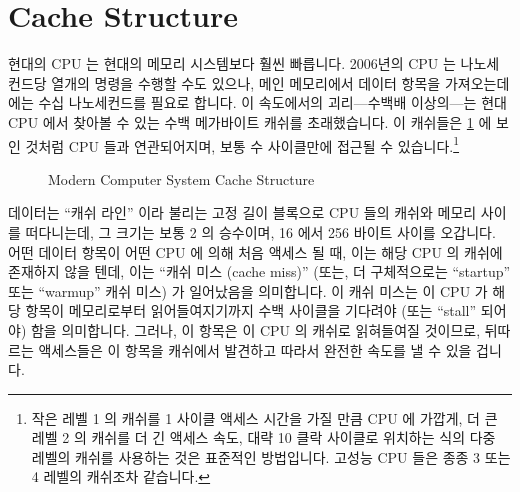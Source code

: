 \fi

\section{Cache Structure}
\label{sec:app:whymb:Cache Structure}

현대의 CPU 는 현대의 메모리 시스템보다 훨씬 빠릅니다.
2006년의 CPU 는 나노세컨드당 열개의 명령을 수행할 수도 있으나, 메인 메모리에서
데이터 항목을 가져오는데에는 수십 나노세컨드를 필요로 합니다.
이 속도에서의 괴리---수백배 이상의---는 현대 CPU 에서 찾아볼 수 있는 수백
메가바이트 캐쉬를 초래했습니다.
이 캐쉬들은
\cref{fig:app:whymb:Modern Computer System Cache Structure}
에 보인 것처럼 CPU 들과 연관되어지며, 보통 수 사이클만에 접근될 수
있습니다.\footnote{
	작은 레벨 1 의 캐쉬를 1 사이클 액세스 시간을 가질 만큼 CPU 에 가깝게,
	더 큰 레벨 2 의 캐쉬를 더 긴 액세스 속도, 대략 10 클락 사이클로
	위치하는 식의 다중 레벨의 캐쉬를 사용하는 것은 표준적인 방법입니다.
	고성능 CPU 들은 종종 3 또는 4 레벨의 캐쉬조차 같습니다.}

\iffalse

Modern CPUs are much faster than are modern memory systems.
A 2006 CPU might be capable of executing ten instructions per nanosecond,
but will require many tens of nanoseconds to fetch a data item from
main memory.
This disparity in speed---more than two orders of magnitude---has
resulted in the multi-megabyte caches found on modern CPUs.
These caches are associated with the CPUs as shown in
\cref{fig:app:whymb:Modern Computer System Cache Structure},
and can typically be accessed in a few cycles.\footnote{
	It is standard practice to use multiple levels of cache,
	with a small level-one cache close to the CPU with
	single-cycle access time, and a larger level-two cache
	with a longer access time, perhaps roughly ten clock cycles.
	Higher-performance CPUs often have three or even four levels
	of cache.}

\fi

\begin{figure}
\centering
{}
\caption{Modern Computer System Cache Structure}
\label{fig:app:whymb:Modern Computer System Cache Structure}
\end{figure}

데이터는 ``캐쉬 라인'' 이라 불리는 고정 길이 블록으로 CPU 들의 캐쉬와
메모리 사이를 떠다니는데, 그 크기는 보통 2 의 승수이며, 16 에서 256 바이트
사이를 오갑니다.
어떤 데이터 항목이 어떤 CPU 에 의해 처음 액세스 될 때, 이는 해당 CPU 의 캐쉬에
존재하지 않을 텐데, 이는 ``캐쉬 미스 (cache miss)'' (또는, 더 구체적으로는
``startup'' 또는 ``warmup'' 캐쉬 미스) 가 일어났음을 의미합니다.
이 캐쉬 미스는 이 CPU 가 해당 항목이 메모리로부터 읽어들여지기까지 수백
사이클을 기다려야 (또는 ``stall'' 되어야) 함을 의미합니다.
그러나, 이 항목은 이 CPU 의 캐쉬로 읽혀들여질 것이므로, 뒤따르는 액세스들은 이
항목을 캐쉬에서 발견하고 따라서 완전한 속도를 낼 수 있을 겁니다.


